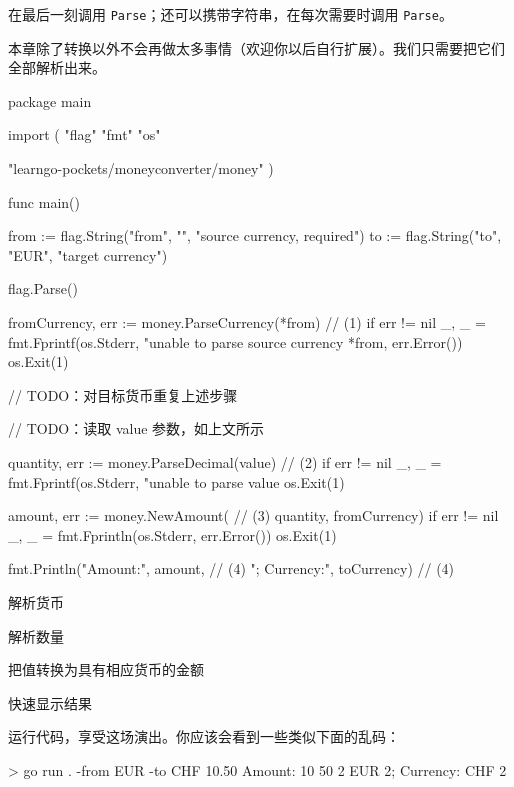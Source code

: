 在最后一刻调用 \texttt{Parse}；还可以携带字符串，在每次需要时调用 \texttt{Parse}。

本章除了转换以外不会再做太多事情（欢迎你以后自行扩展）。我们只需要把它们全部解析出来。

\begin{gocode}[title={代码清单 6.28 \texttt{main.go}：解析 \texttt{Currency} 和 \texttt{Amount}}]
package main

import (
    "flag"
    "fmt"
    "os"

    "learngo-pockets/moneyconverter/money"
)

func main() {
    from := flag.String("from", "", "source currency, required")
    to := flag.String("to", "EUR", "target currency")

    flag.Parse()

    fromCurrency, err := money.ParseCurrency(*from) // (1)
    if err != nil {
        _, _ = fmt.Fprintf(os.Stderr,
            "unable to parse source currency %
            *from, err.Error())
        os.Exit(1)
    }

    // TODO：对目标货币重复上述步骤

    // TODO：读取 value 参数，如上文所示

    quantity, err := money.ParseDecimal(value) // (2)
    if err != nil {
        _, _ = fmt.Fprintf(os.Stderr,
            "unable to parse value %
        os.Exit(1)
    }

    amount, err := money.NewAmount( // (3)
        quantity, fromCurrency)
    if err != nil {
        _, _ = fmt.Fprintln(os.Stderr, err.Error())
        os.Exit(1)
    }

    fmt.Println("Amount:", amount, // (4)
        "; Currency:", toCurrency) // (4)
}
\end{gocode}

\begin{codeannotations}
\item 解析货币
\item 解析数量
\item 把值转换为具有相应货币的金额
\item 快速显示结果
\end{codeannotations}

运行代码，享受这场演出。你应该会看到一些类似下面的乱码：

\begin{shellcode}[]
> go run . -from EUR -to CHF 10.50
Amount: {{10 50 2} {EUR 2}}; Currency: {CHF 2}
\end{shellcode}

